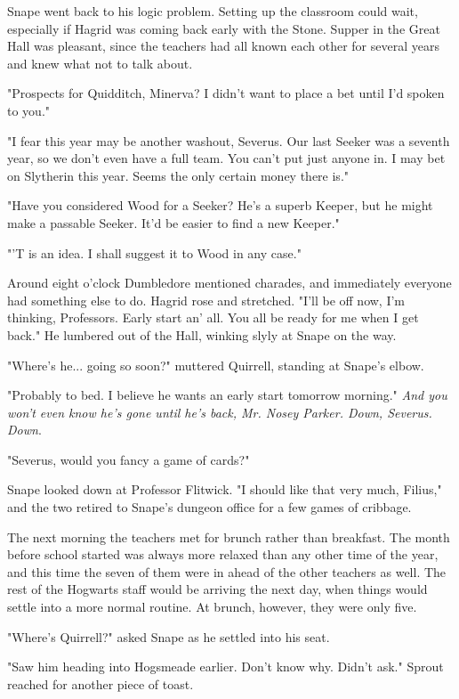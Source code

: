 Snape went back to his logic problem. Setting up the classroom could wait, especially if Hagrid was coming back early with the Stone. Supper in the Great Hall was pleasant, since the teachers had all known each other for several years and knew what not to talk about.

"Prospects for Quidditch, Minerva? I didn't want to place a bet until I'd spoken to you."

"I fear this year may be another washout, Severus. Our last Seeker was a seventh year, so we don't even have a full team. You can't put just anyone in. I may bet on Slytherin this year. Seems the only certain money there is."

"Have you considered Wood for a Seeker? He's a superb Keeper, but he might make a passable Seeker. It'd be easier to find a new Keeper."

"'T is an idea. I shall suggest it to Wood in any case."

Around eight o'clock Dumbledore mentioned charades, and immediately everyone had something else to do. Hagrid rose and stretched. "I'll be off now, I'm thinking, Professors. Early start an' all. You all be ready for me when I get back." He lumbered out of the Hall, winking slyly at Snape on the way.

"Where's he... going so soon?" muttered Quirrell, standing at Snape's elbow.

"Probably to bed. I believe he wants an early start tomorrow morning." \emph{And you won't even know he's gone until he's back, Mr. Nosey Parker. Down, Severus. Down}.

"Severus, would you fancy a game of cards?"

Snape looked down at Professor Flitwick. "I should like that very much, Filius," and the two retired to Snape's dungeon office for a few games of cribbage.

The next morning the teachers met for brunch rather than breakfast. The month before school started was always more relaxed than any other time of the year, and this time the seven of them were in ahead of the other teachers as well. The rest of the Hogwarts staff would be arriving the next day, when things would settle into a more normal routine. At brunch, however, they were only five.

"Where's Quirrell?" asked Snape as he settled into his seat.

"Saw him heading into Hogsmeade earlier. Don't know why. Didn't ask." Sprout reached for another piece of toast.

